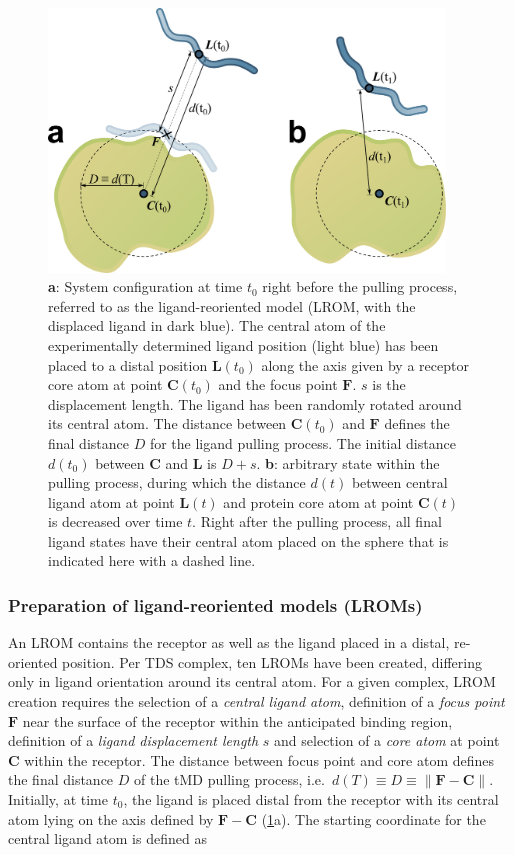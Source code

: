 \begin{figure}
\centering
\includegraphics[height=7cm]{gfx/dmd/scheme_geometry_two_panels_002.pdf}
\caption[]{
\textbf{a}: System configuration at time $t_0$ right before the pulling process,
referred to as the ligand-reoriented model (LROM, with the displaced ligand in
dark blue). The central atom of the experimentally determined ligand position
(light blue) has been placed to a distal position $\bm{L}(t_0)$ along the axis
given by a receptor core atom at point $\bm{C}(t_0)$ and the focus point
$\bm{F}$. $s$ is the displacement length. The ligand has been randomly rotated
around its central atom. The distance between $\bm{C}(t_0)$ and $\bm{F}$ defines
the final distance $D$ for the ligand pulling process. The initial distance
$d(t_0)$ between $\bm{C}$ and $\bm{L}$ is $D+s$.
\textbf{b}: arbitrary state within the pulling process, during which the
distance $d(t)$ between central ligand atom at point $\bm{L}(t)$ and protein
core atom at point $\bm{C}(t)$ is decreased over time $t$. Right after the
pulling process, all final ligand states have their central atom placed on the
sphere that is indicated here with a dashed line.
}
\label{fig:dmd:geometry_scheme}
\end{figure}

\subsubsection{Preparation of ligand-reoriented models (LROMs)}
\label{dmd:lrom_preparation}
An LROM contains
the receptor as well as the ligand placed in a distal, re-oriented position. Per
TDS complex, ten LROMs have been created, differing only in ligand orientation
around its central atom. For a given complex, LROM creation requires the
selection of a \textit{central ligand atom}, definition of a \textit{focus
point} $\bm{F}$ near the surface of the receptor within the anticipated binding
region, definition of a \textit{ligand displacement length} $s$ and selection of
a \textit{core atom} at point $\bm{C}$ within the receptor. The distance between
focus point and core atom defines the final distance $D$ of the tMD pulling
process, i.e.\  $d(T) \equiv D \equiv  \lVert \bm{F}-\bm{C} \rVert$. Initially,
at time $t_0$, the ligand is placed distal from the receptor with its central
atom lying on the axis defined by $\bm{F}-\bm{C}$
(\cref{fig:dmd:geometry_scheme}a). The starting coordinate for the central
ligand atom is defined as


